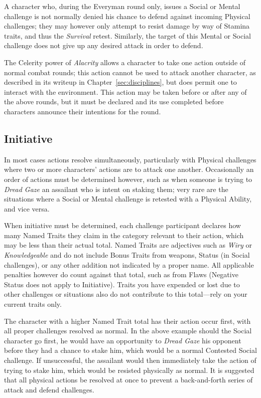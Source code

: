 A character who, during the Everyman round only, issues a Social or Mental challenge is not normally denied 
his chance to defend against incoming Physical challenges; they may however only attempt to resist damage 
by way of Stamina traits, and thus the \emph{Survival} retest.  Similarly, the target of this Mental or 
Social challenge does not give up any desired attack in order to defend.

The Celerity power of \emph{Alacrity} allows a character to take one action outside of normal combat 
rounds; this action cannot be used to attack another character, as described in its writeup in 
Chapter~\ref{sec:disciplines}, but does permit one to interact with the environment.  This action may 
be taken before or after any of the above rounds, but it must be declared and its use completed before 
characters announce their intentions for the round.

\subsection{Initiative}	
In most cases actions resolve simultaneously, particularly with Physical challenges where 
two or more characters' actions are to attack one another.  Occasionally an order of actions 
must be determined however, such as when someone is trying to \emph{Dread Gaze} an assailant 
who is intent on staking them; very rare are the situations where a Social or Mental challenge 
is retested with a Physical Ability, and vice versa.

When initiative must be determined, each challenge participant declares how many Named 
Traits they claim in the category relevant to their action, which may be less than their 
actual total.  Named Traits are adjectives such as \emph{Wiry} or \emph{Knowledgeable} 
and do not include Bonus Traits from weapons, Status (in Social challenges), or any other 
addition not indicated by a proper name.  All applicable penalties however do count 
against that total, such as from Flaws (Negative Status does not apply to Initiative).  Traits 
you have expended or lost due to other challenges or situations also do not contribute to this 
total---rely on your current traits only.

The character with a higher Named Trait total has their action occur first, with all 
proper challenges resolved as normal.  In the above example should the Social character go 
first, he would have an opportunity to \emph{Dread Gaze} his opponent before they had a 
chance to stake him, which would be a normal Contested Social challenge.  If unsuccessful, 
the assailant would then immediately take the action of trying to stake him, which would be 
resisted physically as normal.  It is suggested that all physical actions be resolved at once 
to prevent a back-and-forth series of attack and defend challenges.

